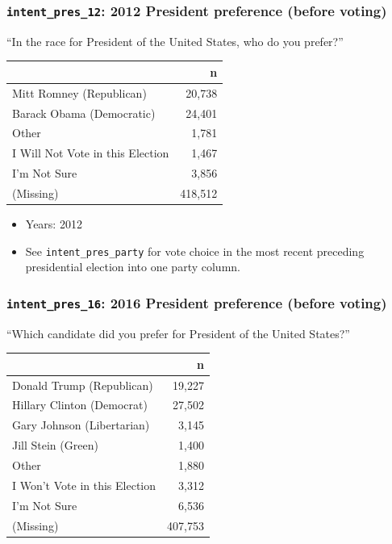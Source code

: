 \documentclass[10pt,article,oneside]{memoir}
\theoremstyle{definition}
\begin{document}
\hypertarget{intent_pres_12-2012-president-preference-before-voting}{%
\subsubsection{\texorpdfstring{\texttt{intent\_pres\_12}: 2012 President
preference (before
voting)}{intent\_pres\_12: 2012 President preference (before voting)}}\label{intent_pres_12-2012-president-preference-before-voting}}

``In the race for President of the United States, who do you prefer?''

\begin{table}[H]
\centering
\begin{tabular}{lr}
\toprule
 & n\\
\midrule
Mitt Romney (Republican) & 20,738\\
Barack Obama (Democratic) & 24,401\\
Other & 1,781\\
I Will Not Vote in this Election & 1,467\\
I'm Not Sure & 3,856\\
(Missing) & 418,512\\
\bottomrule
\end{tabular}
\end{table}

\begin{itemize}
\tightlist
\item
  Years: 2012
\item
  See \texttt{intent\_pres\_party} for vote choice in the most recent
  preceding presidential election into one party column.
\end{itemize}

\hypertarget{intent_pres_16-2016-president-preference-before-voting}{%
\subsubsection{\texorpdfstring{\texttt{intent\_pres\_16}: 2016 President
preference (before
voting)}{intent\_pres\_16: 2016 President preference (before voting)}}\label{intent_pres_16-2016-president-preference-before-voting}}

``Which candidate did you prefer for President of the United States?''

\begin{table}[H]
\centering
\begin{tabular}{lr}
\toprule
 & n\\
\midrule
Donald Trump (Republican) & 19,227\\
Hillary Clinton (Democrat) & 27,502\\
Gary Johnson (Libertarian) & 3,145\\
Jill Stein (Green) & 1,400\\
Other & 1,880\\
I Won't Vote in this Election & 3,312\\
I'm Not Sure & 6,536\\
(Missing) & 407,753\\
\bottomrule
\end{tabular}
\end{table}
\end{document}
